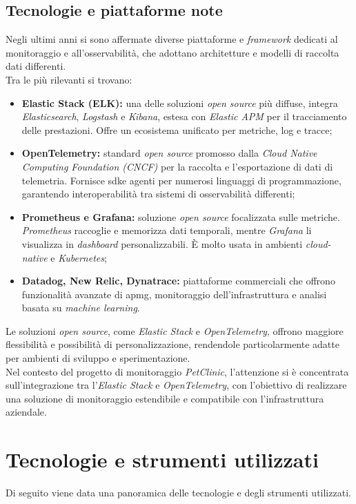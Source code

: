 \subsection{Tecnologie e piattaforme note}
Negli ultimi anni si sono affermate diverse piattaforme e \emph{framework} dedicati al monitoraggio e all'osservabilità, che adottano architetture e modelli di raccolta dati differenti. \\
Tra le più rilevanti si trovano:
\begin{itemize}
\item \textbf{Elastic Stack (ELK):} una delle soluzioni \emph{open source} più diffuse, integra \emph{Elasticsearch}, \emph{Logstash} e \emph{Kibana}, estesa con \emph{Elastic APM} per il tracciamento delle prestazioni. Offre un ecosistema unificato per metriche, log e tracce;

\item \textbf{OpenTelemetry:} standard \emph{open source} promosso dalla \emph{Cloud Native Computing Foundation (CNCF)} per la raccolta e l'esportazione di dati di telemetria. Fornisce \gls{sdk}\glsfirstoccur e agenti per numerosi linguaggi di programmazione, garantendo interoperabilità tra sistemi di osservabilità differenti;

\item \textbf{Prometheus e Grafana:} soluzione \emph{open source} focalizzata sulle metriche. \emph{Prometheus} raccoglie e memorizza dati temporali, mentre \emph{Grafana} li visualizza in \emph{dashboard} personalizzabili. È molto usata in ambienti \emph{cloud-native} e \emph{Kubernetes};

\item \textbf{Datadog, New Relic, Dynatrace:} piattaforme commerciali che offrono funzionalità avanzate di \gls{apmg}, monitoraggio dell'infrastruttura e analisi basata su \emph{machine learning}.
\end{itemize}
Le soluzioni \emph{open source}, come \emph{Elastic Stack} e \emph{OpenTelemetry}, offrono maggiore flessibilità e possibilità di personalizzazione, rendendole particolarmente adatte per ambienti di sviluppo e sperimentazione. \\
Nel contesto del progetto di monitoraggio \emph{PetClinic}, l'attenzione si è concentrata sull'integrazione tra l'\emph{Elastic Stack} e \emph{OpenTelemetry}, con l'obiettivo di realizzare una soluzione di monitoraggio estendibile e compatibile con l'infrastruttura aziendale.


\newpage
\section{Tecnologie e strumenti utilizzati}
\label{sec:tecnologie-strumenti}
Di seguito viene data una panoramica delle tecnologie e degli strumenti utilizzati.

